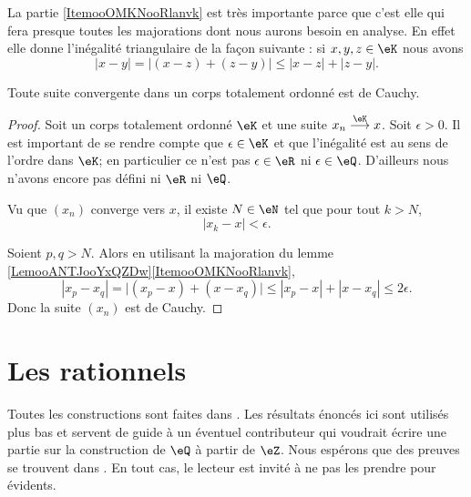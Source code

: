 \begin{remark}      \label{RemooJCAUooKkuglX}
    La partie \ref{ItemooOMKNooRlanvk} est très importante parce que c'est elle qui fera presque toutes les majorations dont nous aurons besoin en analyse. En effet elle donne l'inégalité triangulaire de la façon suivante : si \( x,y,z\in \eK\) nous avons
    \begin{equation}
        | x-y |= |  (x-z)+(z-y) |\leq | x-z |+| z-y |.
    \end{equation}
\end{remark}

\begin{proposition}     \label{PROPooTFVOooFoSHPg}
    Toute suite convergente dans un corps totalement ordonné est de Cauchy.
\end{proposition}

\begin{proof}
    Soit un corps totalement ordonné \( \eK\) et une suite \( x_n\stackrel{\eK}{\longrightarrow}x\). Soit \( \epsilon>0\). Il est important de se rendre compte que \( \epsilon\in \eK\) et que l'inégalité est au sens de l'ordre dans \( \eK\); en particulier ce n'est pas \( \epsilon\in \eR\) ni \( \epsilon\in \eQ\). D'ailleurs nous n'avons encore pas défini ni \( \eR\) ni \( \eQ\).

    Vu que \( (x_n)\) converge vers \( x\), il existe \( N\in \eN\) tel que pour tout \( k>N\), 
    \begin{equation}
        | x_k-x |<\epsilon.
    \end{equation}
    
    Soient \( p,q>N\). Alors en utilisant la majoration du lemme \ref{LemooANTJooYxQZDw}\ref{ItemooOMKNooRlanvk},
    \begin{equation}
        | x_p-x_q |=\big| (x_p-x)+(x-x_q) \big|\leq | x_p-x |+| x-x_q |\leq 2\epsilon.
    \end{equation}
    Donc la suite \( (x_n)\) est de Cauchy.
\end{proof}

\section{Les rationnels}

Toutes les constructions sont faites dans \cite{RWWJooJdjxEK}. Les résultats énoncés ici sont utilisés plus bas et servent de guide à un éventuel contributeur qui voudrait écrire une partie sur la construction de \( \eQ\) à partir de \( \eZ\). Nous espérons que des preuves se trouvent dans \cite{RWWJooJdjxEK}. En tout cas, le lecteur est invité à ne pas les prendre pour évidents.

